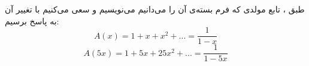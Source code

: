 \p
طبق
،
تابع مولدی که فرم بسته‌ی آن را می‌دانیم می‌نویسیم و سعی می‌کنیم با تغییر آن به پاسخ برسیم:
$$A(x) = 1 + x + x^2 + ... = \frac{1}{1 - x}$$
$$A(5x) = 1 + 5x + 25x^2 + ... = \frac{1}{1 - 5x}$$
 
